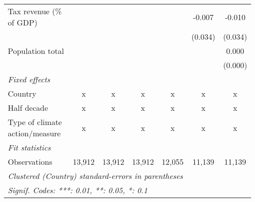 \begin{tabular}{lcccccc}
   Tax revenue (\% of GDP)                                            &         &         &         &         & -0.007  & -0.010\\   
                                                                      &         &         &         &         & (0.034) & (0.034)\\   
   Population total                                                   &         &         &         &         &         & 0.000\\   
                                                                      &         &         &         &         &         & (0.000)\\   
   \emph{Fixed effects}\\
   Country                                                            & x       & x       & x       & x       & x       & x\\  
   Half decade                                                        & x       & x       & x       & x       & x       & x\\  
   Type of climate action/measure                                     & x       & x       & x       & x       & x       & x\\  
   \midrule \emph{Fit statistics}\\
   Observations                                                       & 13,912  & 13,912  & 13,912  & 12,055  & 11,139  & 11,139\\  
   \midrule
   \multicolumn{7}{l}{\emph{Clustered (Country) standard-errors in parentheses}}\\
   \multicolumn{7}{l}{\emph{Signif. Codes: ***: 0.01, **: 0.05, *: 0.1}}\\
\end{tabular}
\par\endgroup


